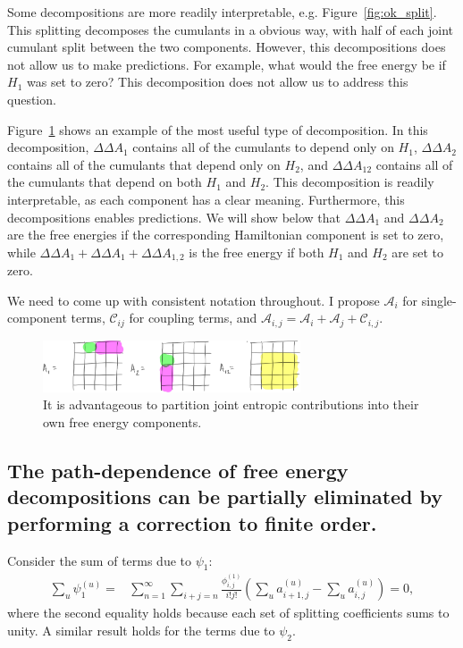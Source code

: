 \documentclass{article}
\begin{document}
Some decompositions are more readily interpretable, e.g. Figure~\ref{fig:ok_split}. This splitting decomposes the cumulants in a obvious way, with half of each joint cumulant split between the two components. However, this decompositions does not allow us to make predictions. For example, what would the free energy be if $H_1$ was set to zero? This decomposition does not allow us to address this question.


Figure~\ref{fig:good_split} shows an example of the most useful type of decomposition. In this decomposition, $\Delta\Delta A_1$ contains all of the cumulants to depend only on $H_1$, $\Delta\Delta A_2$ contains all of the cumulants that depend only on $H_2$, and $\Delta\Delta A_{12}$ contains all of the cumulants that depend on both $H_1$ and $H_2$. This decomposition is readily interpretable, as each component has a clear meaning. Furthermore, this decompositions enables predictions. We will show below that $\Delta\Delta A_1$ and $\Delta\Delta A_2$ are the free energies if the corresponding Hamiltonian component is set to zero, while $\Delta\Delta A_1 + \Delta\Delta A_1 + \Delta\Delta A_{1,2}$ is the free energy if both $H_1$ and $H_2$ are set to zero.

We need to come up with consistent notation throughout. I propose $\mathcal{A}_i$ for single-component terms, $\mathcal{C}_{ij}$ for coupling terms, and $\mathcal{A}_{i,j} = \mathcal{A}_i + \mathcal{A}_j + \mathcal{C}_{i,j}$.

\begin{figure}[tb]
\centering
\includegraphics[width=3in]{figure5.pdf}
\caption{It is advantageous to partition joint entropic contributions into their own free energy components.}
\label{fig:good_split}
\end{figure}




\subsection{The path-dependence of free energy decompositions can be partially eliminated by performing a correction to finite order.}

Consider the sum of terms due to $\psi_1$:
\begin{align*}
\sum_u \psi_1^{(u)} =&
	\sum_{n=1}^{\infty}
    \sum_{i+j=n}
        \frac{\phi_{i,j}^{(1)}}{i!j!}
        \left(
        		\sum_u a_{i+1,j}^{(u)} -
        		\sum_u a_{i,j}^{(u)}
        \right) = 0,
\end{align*}
where the second equality holds because each set of splitting coefficients sums to unity. A similar result holds for the terms due to $\psi_2$.
\end{document}
